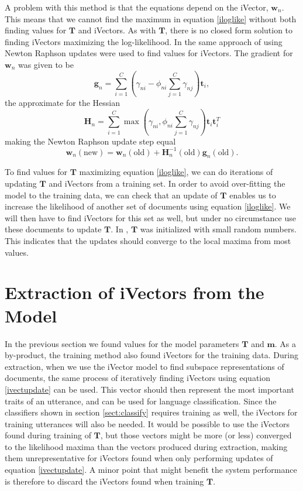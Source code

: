 A problem with this method is that the equations depend on the iVector, $\mathbf{w}_n$. This means that we cannot find the maximum in equation \ref{iloglike} without both finding values for $\mathbf{T}$ and iVectors. As with $\mathbf{T}$, there is no closed form solution to finding iVectors maximizing the log-likelihood. In \cite{srivector} the same approach of using Newton Raphson updates were used to find values for iVectors. The gradient for $\mathbf{w}_n$ was given to be
\begin{equation}
\label{ivectgrad}
\mathbf{g}_n = \sum_{i=1}^C \left(\gamma_{ni}-\phi_{ni}\sum_{j=1}^C \gamma_{nj}\right)\mathbf{t}_i,
\end{equation}
the approximate for the Hessian
\begin{equation}
\label{ivecthessian}
\mathbf{H}_n = \sum_{i=1}^C \max\left(\gamma_{ni}, \phi_{ni}\sum_{j=1}^C \gamma_{nj}\right)\mathbf{t}_i \mathbf{t}_i^T
\end{equation}
making the Newton Raphson update step equal
\begin{equation}
\label{ivectupdate}
\mathbf{w}_n(\text{new}) = \mathbf{w}_n(\text{old})+\mathbf{H}_n^{-1}(\text{old})\mathbf{g}_n(\text{old}).
\end{equation}

To find values for $\mathbf{T}$ maximizing equation \ref{iloglike}, we can do iterations of updating $\mathbf{T}$ and iVectors from a training set. In order to avoid over-fitting the model to the training data, we can check that an update of $\mathbf{T}$ enables us to increase the likelihood of another set of documents using equation \ref{iloglike}. We will then have to find iVectors for this set as well, but under no circumstance use these documents to update $\mathbf{T}$. In \cite{lrivector}, $\mathbf{T}$ was initialized with small random numbers. This indicates that the updates should converge to the local maxima from most values. 

\section{Extraction of iVectors from the Model}
\label{sect:ivectextract}

In the previous section we found values for the model parameters $\mathbf{T}$ and $\mathbf{m}$. As a by-product, the training method also found iVectors for the training data. During extraction, when we use the iVector model to find subspace representations of documents, the same process of iteratively finding iVectors using equation \ref{ivectupdate} can be used. This vector should then represent the most important traits of an utterance, and can be used for language classification. Since the classifiers shown in section \ref{sect:classify} requires training as well, the iVectors for training utterances will also be needed. It would be possible to use the iVectors found during training of $\mathbf{T}$, but those vectors might be more (or less) converged to the likelihood maxima than the vectors produced during extraction, making them unrepresentative for iVectors found when only performing updates of equation \ref{ivectupdate}.  A minor point that might benefit the system performance is therefore to discard the iVectors found when training $\mathbf{T}$.

